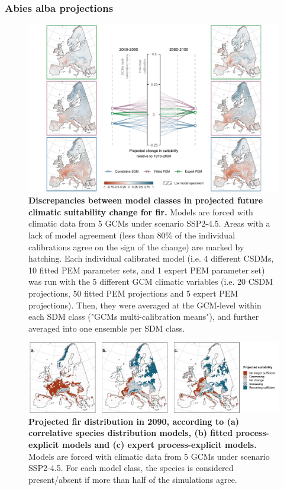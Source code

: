 \clearpage

\subsubsection{Abies alba projections}

\begin{figure}[htpb]
\centering
\includegraphics{chapter4/figs/abiesalba_cascade-1.pdf}
\caption{\textbf{Discrepancies between model classes in projected future climatic suitability change for fir.} Models are forced with climatic data from 5 GCMs under scenario SSP2-4.5. Areas with a lack of model agreement (less than 80\% of the individual calibrations agree on the sign of the change) are marked by hatching. Each individual calibrated model (i.e. 4 different CSDMs, 10 fitted PEM parameter sets, and 1 expert PEM parameter set) was run with the 5 different GCM climatic variables (i.e. 20 CSDM projections, 50 fitted PEM projections and 5 expert PEM projections). Then, they were averaged at the GCM-level within each SDM class ("GCMs multi-calibration means"), and further averaged into one ensemble per SDM class.}
\label{app:aalbproj}
\end{figure}

\begin{figure}[htpb]
\centering
\vspace*{-0.2cm}
\includegraphics{chapter4/figs/abiesalba_distributions-1.pdf}
\caption{\textbf{Projected fir distribution in 2090, according to (a) correlative species distribution models, (b) fitted process-explicit models and (c) expert process-explicit models.} Models are forced with climatic data from 5 GCMs under scenario SSP2-4.5. For each model class, the species is considered present/absent if more than half of the simulations agree.}
\label{app:aalbdist}
\vspace*{-6cm}
\end{figure}